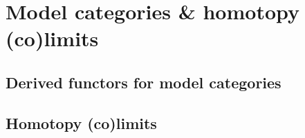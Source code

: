 
\section{Model categories \& homotopy (co)limits}
\subsection{Derived functors for model categories}
\subsection{Homotopy (co)limits}
